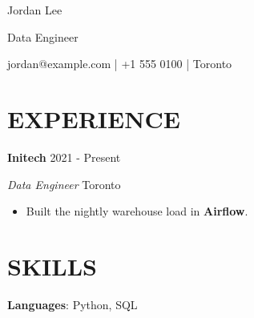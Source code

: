 \documentclass[11pt]{article}
\begin{document}
{\LARGE Jordan Lee}\par
Data Engineer\par
jordan@example.com | +1 555 0100 | Toronto\par
\section*{EXPERIENCE}
\textbf{Initech} \hfill 2021 - Present\par
\textit{Data Engineer} \hfill Toronto\par
\begin{itemize}
\item Built the nightly warehouse load in \textbf{Airflow}.
\end{itemize}
\section*{SKILLS}
\textbf{Languages}: Python, SQL\par
\end{document}
